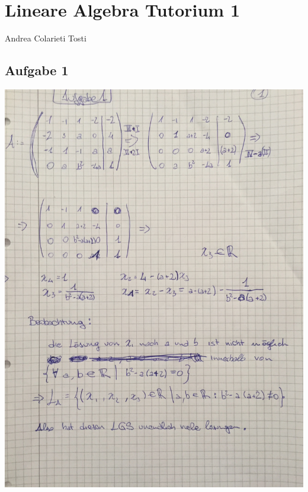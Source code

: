 \documentclass[10pt,a4paper]{article}
\begin{document}
\section{Lineare Algebra Tutorium 1}
\begin{center}
Andrea Colarieti Tosti
\end{center}
\subsection{Aufgabe 1}
\includegraphics[scale=0.2, angle=270]{A1_1.jpg} 
\newpage
\end{document}
